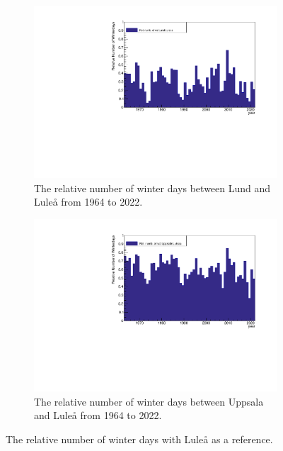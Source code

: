 \documentclass[aps,prl,groupedaddress,twocolumn]{revtex4-1}
\begin{document}
\begin{figure}[h!]
    \begin{subfigure}{0.45\textwidth}
            \includegraphics[width=\textwidth,trim= 0 0 0 0.5cm,clip]{rel_Lund_hist.pdf}
            \caption{The relative number of winter days between Lund and Luleå from 1964 to 2022.}
            \label{fig:rel_lund}
    \end{subfigure}

    \vspace{-0.2cm}
    \begin{subfigure}{0.45\textwidth}
            \includegraphics[width=\textwidth,trim= 0 0 0 0.5cm,clip]{rel_Uppsala_hist.pdf}
            \caption{The relative number of winter days between Uppsala and Luleå from 1964 to 2022.}
            \label{fig:rel_uppsala}
    \end{subfigure}
    \caption{The relative number of winter days with Luleå as a reference.}
    \label{fig:rel_winterdays}
\end{figure}
\vspace{-0.2cm}
\end{document}
